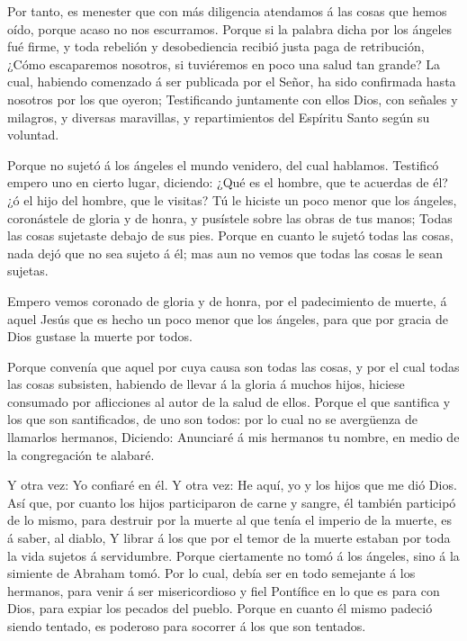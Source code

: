 Por tanto, es menester que con más diligencia atendamos á
las cosas que hemos oído, porque acaso no nos escurramos. 
Porque si la palabra dicha por los ángeles fué firme, y toda rebelión y
desobediencia recibió justa paga de retribución,  ¿Cómo
escaparemos nosotros, si tuviéremos en poco una salud tan grande? La
cual, habiendo comenzado á ser publicada por el Señor, ha sido
confirmada hasta nosotros por los que oyeron;  Testificando
juntamente con ellos Dios, con señales y milagros, y diversas
maravillas, y repartimientos del Espíritu Santo según su voluntad.

 Porque no sujetó á los ángeles el mundo venidero, del cual
hablamos.  Testificó empero uno en cierto lugar, diciendo:
¿Qué es el hombre, que te acuerdas de él? ¿ó el hijo del hombre, que le
visitas?  Tú le hiciste un poco menor que los ángeles,
coronástele de gloria y de honra, y pusístele sobre las obras de tus
manos;  Todas las cosas sujetaste debajo de sus pies. Porque
en cuanto le sujetó todas las cosas, nada dejó que no sea sujeto á él;
mas aun no vemos que todas las cosas le sean sujetas.

 Empero vemos coronado de gloria y de honra, por el
padecimiento de muerte, á aquel Jesús que es hecho un poco menor que los
ángeles, para que por gracia de Dios gustase la muerte por todos.

 Porque convenía que aquel por cuya causa son todas las
cosas, y por el cual todas las cosas subsisten, habiendo de llevar á la
gloria á muchos hijos, hiciese consumado por aflicciones al autor de la
salud de ellos.  Porque el que santifica y los que son
santificados, de uno son todos: por lo cual no se avergüenza de
llamarlos hermanos,  Diciendo: Anunciaré á mis hermanos tu
nombre, en medio de la congregación te alabaré.

 Y otra vez: Yo confiaré en él. Y otra vez: He aquí, yo y
los hijos que me dió Dios.  Así que, por cuanto los hijos
participaron de carne y sangre, él también participó de lo mismo, para
destruir por la muerte al que tenía el imperio de la muerte, es á saber,
al diablo,  Y librar á los que por el temor de la muerte
estaban por toda la vida sujetos á servidumbre.  Porque
ciertamente no tomó á los ángeles, sino á la simiente de Abraham tomó.
 Por lo cual, debía ser en todo semejante á los hermanos,
para venir á ser misericordioso y fiel Pontífice en lo que es para con
Dios, para expiar los pecados del pueblo.  Porque en cuanto
él mismo padeció siendo tentado, es poderoso para socorrer á los que son
tentados.


